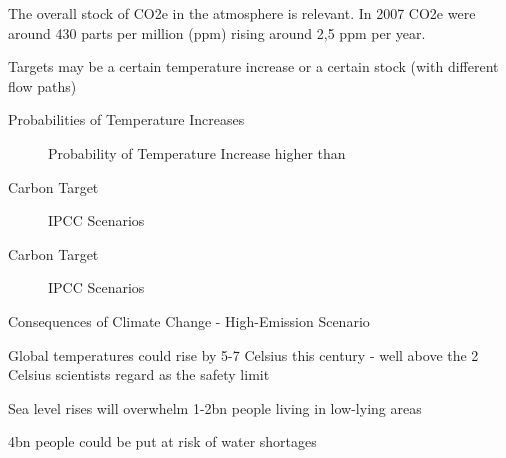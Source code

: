 	The overall stock of CO2e in the atmosphere is relevant. In 2007 CO2e were around 430 parts per million (ppm) rising around 2,5 ppm per year.

	Targets may be a certain temperature increase or a certain stock (with different flow paths)






{Probabilities of Temperature Increases}
\begin{center}
\begin{figure}[h!]
\centering
{} %
\caption{Probability of Temperature Increase higher than}
\label{fig:temperature}
\end{figure}
\end{center}

{Carbon Target}
\begin{center}
\begin{figure}[h!]
\centering
{} %
\caption{IPCC Scenarios}
\label{fig:emissions}
\end{figure}
\end{center}

{Carbon Target}
\begin{center}
\begin{figure}[h!]
\centering
{} %
\caption{IPCC Scenarios}
\label{fig:emissions}
\end{figure}
\end{center}

{Consequences of Climate Change - High-Emission Scenario}






	Global temperatures could rise by 5-7 Celsius this century - well above the 2 Celsius scientists regard as the safety limit

	Sea level rises will overwhelm 1-2bn people living in low-lying areas

	4bn people could be put at risk of water shortages

